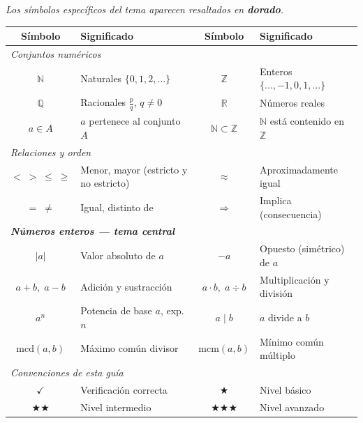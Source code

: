 \documentclass[11pt, letterpaper]{article}
\begin{document}
\begin{tcolorbox}[importantbox, title={Glosario de simbolog\'ia}]
{\small\textit{Los s\'imbolos espec\'ificos del tema aparecen resaltados en \textcolor{zenitgold}{\textbf{dorado}}.}}
\medskip
\begin{center}
\renewcommand{\arraystretch}{1.32}
\begin{tabular}{c p{4.8cm} | c p{4.8cm}}
\toprule
\textbf{S\'imbolo} & \textbf{Significado} & \textbf{S\'imbolo} & \textbf{Significado}\\
\midrule
\multicolumn{4}{l}{\textit{Conjuntos num\'ericos}}\\
$\mathbb{N}$ & Naturales $\{0,1,2,\ldots\}$ &
$\mathbb{Z}$ & Enteros $\{\ldots,-1,0,1,\ldots\}$\\
$\mathbb{Q}$ & Racionales $\frac{p}{q}$, $q\neq 0$ &
$\mathbb{R}$ & N\'umeros reales\\
$a\in A$ & $a$ pertenece al conjunto $A$ &
$\mathbb{N}\subset\mathbb{Z}$ & $\mathbb{N}$ est\'a contenido en $\mathbb{Z}$\\[3pt]
\multicolumn{4}{l}{\textit{Relaciones y orden}}\\
$<\;>\;\leq\;\geq$ & Menor, mayor (estricto y no estricto) &
$\approx$ & Aproximadamente igual\\
$=\;\neq$ & Igual, distinto de &
$\Rightarrow$ & Implica (consecuencia)\\[3pt]
\multicolumn{4}{l}{\textit{\textcolor{zenitgold}{\textbf{N\'umeros enteros --- tema central}}}}\\
\textcolor{zenitgold}{$|a|$} & \textcolor{zenitgold}{Valor absoluto de $a$} &
\textcolor{zenitgold}{$-a$} & \textcolor{zenitgold}{Opuesto (sim\'etrico) de $a$}\\
\textcolor{zenitgold}{$a+b,\;a-b$} & \textcolor{zenitgold}{Adici\'on y sustracci\'on} &
\textcolor{zenitgold}{$a\cdot b,\;a\div b$} & \textcolor{zenitgold}{Multiplicaci\'on y divisi\'on}\\
\textcolor{zenitgold}{$a^n$} & \textcolor{zenitgold}{Potencia de base $a$, exp. $n$} &
\textcolor{zenitgold}{$a\mid b$} & \textcolor{zenitgold}{$a$ divide a $b$}\\
\textcolor{zenitgold}{$\text{mcd}(a,b)$} & \textcolor{zenitgold}{M\'aximo com\'un divisor} &
\textcolor{zenitgold}{$\text{mcm}(a,b)$} & \textcolor{zenitgold}{M\'inimo com\'un m\'ultiplo}\\[3pt]
\multicolumn{4}{l}{\textit{Convenciones de esta gu\'ia}}\\
$\checkmark$ & Verificaci\'on correcta &
$\bigstar$ & Nivel b\'asico\\
$\bigstar\bigstar$ & Nivel intermedio &
$\bigstar\bigstar\bigstar$ & Nivel avanzado\\
\bottomrule
\end{tabular}
\end{center}
\end{tcolorbox}
\end{document}
